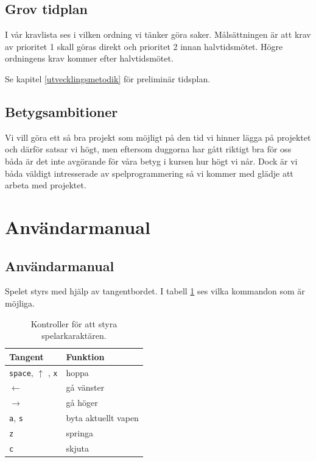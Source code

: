 \documentclass{scrartcl}
\newcommand{\code}[1]%
{\texttt{#1}}
\begin{document}
\subsection{Grov tidplan}
I vår kravlista ses i vilken ordning vi tänker göra saker. Målsättningen är att krav av prioritet 1 skall göras direkt och prioritet 2 innan halvtidsmötet. Högre ordningens krav kommer efter halvtidsmötet.

Se kapitel \ref{utvecklingsmetodik} för preliminär tidsplan.

\subsection{Betygsambitioner}
Vi vill göra ett så bra projekt som möjligt på den tid vi hinner lägga på projektet och därför satsar vi högt, men eftersom duggorna har gått riktigt bra för oss båda är det inte avgörande för våra betyg i kursen hur högt vi når. Dock är vi båda väldigt intresserade av spelprogrammering så vi kommer med glädje att arbeta med projektet.

\section{Användarmanual}
\subsection{Användarmanual}

Spelet styrs med hjälp av tangentbordet. I tabell \ref{kontroller} ses vilka kommandon som är möjliga. 

\begin{table}[ht]
\caption{Kontroller för att styra spelarkaraktären.}\label{kontroller}
\centering
    \begin{tabular}{ll}
    \toprule
    Tangent  & Funktion \\
    \midrule
    \code{space}, $\uparrow$ , \code{x} & hoppa \\
    $\leftarrow$  & gå vänster \\
    $\rightarrow$ & gå höger \\
    \code{a}, \code{s}     & byta aktuellt vapen \\
    \code{z}        & springa \\
    \code{c}        & skjuta \\
    \bottomrule
    \end{tabular}
\end{table}
\end{document}
